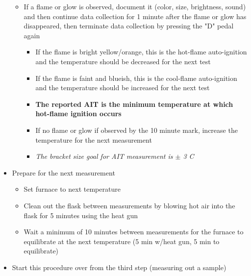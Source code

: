 \documentclass[letterpaper,11pt]{article}
\begin{document}
\begin{itemize}
        \begin{itemize}
        \item If a flame or glow is observed, document it (color, size, 
            brightness, sound) and then continue data collection for 1 minute
            after the flame or glow has disappeared, then terminate data 
            collection by pressing the "D" pedal again
                
                \begin{itemize}
                \item If the flame is bright yellow/orange, this is the 
                    hot-flame auto-ignition and the temperature should be 
                    decreased for the next test
                \item If the flame is faint and blueish, this is the cool-flame 
                    auto-ignition and the temperature should be increased for 
                    the next test
                \item \textbf{The reported AIT is the minimum temperature at 
                    which hot-flame ignition occurs}
                \item If no flame or glow if observed by the 10 minute mark, 
                    increase the temperature for the next measurement
                \item \textit{The bracket size goal for AIT measurement is $\pm$
                3 \degree C}
                \end{itemize}
        
        \end{itemize}
        
    \item Prepare for the next measurement
        
        \begin{itemize}
        \item Set furnace to next temperature
        \item Clean out the flask between measurements by blowing hot air into the 
            flask for 5 minutes using the heat gun
        \item Wait a minimum of 10 minutes between measurements for the furnace to 
            equilibrate at the next temperature (5 min w/heat gun, 5 min 
            to equilibrate)
        \end{itemize}    
    
    \item Start this procedure over from the third step (measuring out a sample)
    \end{itemize}
\end{document}
